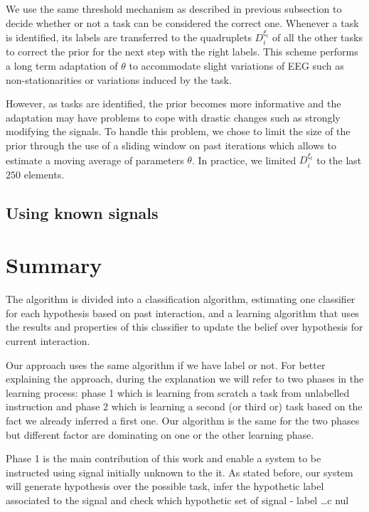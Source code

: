 We use the same threshold mechanism as described in previous subsection to decide whether or not a task can be considered the correct one. Whenever a task is identified, its labels are transferred to the quadruplets $D^{\xi_t}_{i}$ of all the other tasks to correct the prior for the next step with the right labels. This scheme performs a long term adaptation of $\theta$ to accommodate slight variations of EEG such as non-stationarities or variations induced by the task. 

However, as tasks are identified, the prior becomes more informative and the adaptation may have problems to cope with drastic changes such as strongly modifying the signals. To handle this problem, we chose to limit the size of the prior through the use of a sliding window on past iterations which allows to estimate a moving average of parameters $\theta$. In practice, we limited $D^{\xi_t}_{i}$ to the last $250$ elements.

\subsection{Using known signals}


\section{Summary}

The algorithm is  divided into a classification algorithm, estimating one classifier for each hypothesis based on past interaction, and a learning algorithm that uses the results and properties of this classifier to update the belief over hypothesis for current interaction.

Our approach uses the same algorithm if we have label or not. For better explaining the approach, during the explanation we will refer to two phases in the learning process: phase 1 which is learning from scratch a task from unlabelled instruction and phase 2 which is learning a second (or third or) task based on the fact we already inferred a first one. Our algorithm is the same for the two phases but different factor are dominating on one or the other learning phase.

Phase 1 is the main contribution of this work and enable a system to be instructed using signal initially unknown to the it. As stated before, our system will generate hypothesis over the possible task, infer the hypothetic label associated to the signal and check which hypothetic set of signal - label \ldots c nul

